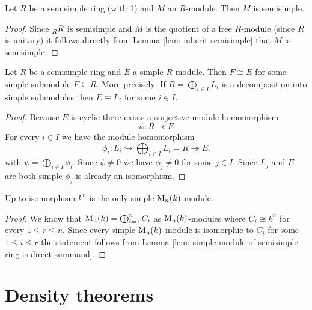 \begin{prop}
 Let $R$ be a semisimple ring (with 1) and $M$ an $R$-module. Then $M$ is semisimple.
\end{prop}
\begin{proof}
 Since $\prescript{}{R}{R}$ is semisimple and $M$ is the quotient of a free $R$-module (since $R$ is unitary) it follows directly from Lemma \ref{lem: inherit semisimple} that $M$ is semisimple.
\end{proof}


\begin{lem}\label{lem: simple module of semisimple ring is direct summand}
 Let $R$ be a semisimple ring and $E$ a simple $R$-module. Then $F \cong E$ for some simple submodule $F \subseteq R$. More precisely: If $R = \bigoplus_{i \in I} L_i$ is a decomposition into simple submodules then $E \cong L_i$ for some $i \in I$.
\end{lem}
\begin{proof}
 Because $E$ is cyclic there exists a surjective module homomorphism
 \[
  \psi \colon R \twoheadrightarrow E
 \]
 For every $i \in I$ we have the module homomorphism
 \[
  \phi_i \colon L_i \hookrightarrow \bigoplus_{i \in I} L_i = R \twoheadrightarrow E.
 \]
 with $\psi = \bigoplus_{i \in I} \phi_i$. Since $\psi \neq 0$ we have $\phi_j \neq 0$ for some $j \in I$. Since $L_j$ and $E$ are both simple $\phi_j$ is already an isomorphism.
\end{proof}


\begin{cor}\label{cor: k^n only simple M_n(k)-module}
 Up to isomorphism $k^n$ is the only simple $\operatorname{M}_n(k)$-module.
\end{cor}
\begin{proof}
 We know that $\operatorname{M}_n(k) = \bigoplus_{i=1}^n C_i$ as $\operatorname{M}_n(k)$-modules where $C_i \cong k^n$ for every $1 \leq r \leq n$. Since every simple $\operatorname{M}_n(k)$-module is isomorphic to $C_i$ for some $1 \leq i \leq r$ the statement follows from Lemma \ref{lem: simple module of semisimple ring is direct summand}.
\end{proof}







\section{Density theorems}


